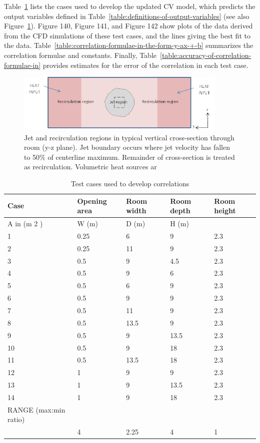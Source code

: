 Table~\ref{table:test-cases-used-to-develop-correlations} lists the cases used to develop the updated CV model, which predicts the output variables defined in Table~\ref{table:definitions-of-output-variables} (see also Figure~\ref{fig:jet-and-recirculation-regions-in-typical}). Figure 140, Figure 141, and Figure 142 show plots of the data derived from the CFD simulations of these test cases, and the lines giving the best fit to the data. Table~\ref{table:correlation-formulae-in-the-form-y-ax-+-b} summarizes the correlation formulae and constants. Finally, Table~\ref{table:accuracy-of-correlation-formulae-in} provides estimates for the error of the correlation in each test case.

\begin{figure}[hbtp] %
\centering
\includegraphics[width=0.9\textwidth, height=0.9\textheight, keepaspectratio=true]{media/image2634.png}
\caption{Jet and recirculation regions in typical vertical cross-section through room (y-z plane). Jet boundary occurs where jet velocity has fallen to 50\% of centerline maximum. Remainder of cross-section is treated as recirculation. Volumetric heat sources ar \protect \label{fig:jet-and-recirculation-regions-in-typical}}
\end{figure}

\begin{longtable}[c]{@{}lllll@{}}
\caption{Test cases used to develop correlations \protect \label{table:test-cases-used-to-develop-correlations}}\\
\toprule 
Case & Opening area & Room width & Room depth & Room height \tabularnewline \midrule
\endhead
A in (m 2 ) & W (m) & D (m) & H (m) \tabularnewline
1 & 0.25 & 6 & 9 & 2.3 \tabularnewline
2 & 0.25 & 11 & 9 & 2.3 \tabularnewline
3 & 0.5 & 9 & 4.5 & 2.3 \tabularnewline
4 & 0.5 & 9 & 6 & 2.3 \tabularnewline
5 & 0.5 & 6 & 9 & 2.3 \tabularnewline
6 & 0.5 & 9 & 9 & 2.3 \tabularnewline
7 & 0.5 & 11 & 9 & 2.3 \tabularnewline
8 & 0.5 & 13.5 & 9 & 2.3 \tabularnewline
9 & 0.5 & 9 & 13.5 & 2.3 \tabularnewline
10 & 0.5 & 9 & 18 & 2.3 \tabularnewline
11 & 0.5 & 13.5 & 18 & 2.3 \tabularnewline
12 & 1 & 9 & 9 & 2.3 \tabularnewline
13 & 1 & 9 & 13.5 & 2.3 \tabularnewline
14 & 1 & 9 & 18 & 2.3 \tabularnewline
RANGE (max:min ratio) \tabularnewline
 & 4 & 2.25 & 4 & 1 \tabularnewline
\bottomrule
\end{longtable}

